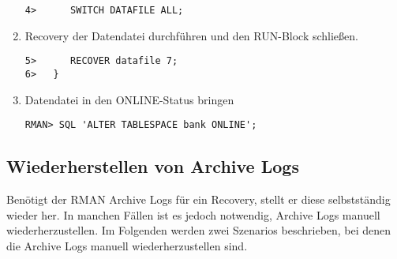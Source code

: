 \begin{enumerate}
            \begin{lstlisting}[caption={Auf den neuen Speicherort umschalten},label=admin1484,language=rman]
4>      SWITCH DATAFILE ALL;
            \end{lstlisting}
            \item Recovery der Datendatei durchf\"uhren und den RUN-Block schlie\ss{}en.
            \begin{lstlisting}[caption={Recovery durchf\"uhren},label=admin1485,language=rman]
5>      RECOVER datafile 7;
6>   }
            \end{lstlisting}
            \item Datendatei in den ONLINE-Status bringen
            \begin{lstlisting}[caption={Datendatei in den ONLINE-Status bringen},label=admin1486,language=rman,emph={[9]ALTER,TABLESPACE,ONLINE},emphstyle={[9]\color{magenta}\bfseries}]
RMAN> SQL 'ALTER TABLESPACE bank ONLINE';
            \end{lstlisting}
          \end{enumerate}
      \subsection{Wiederherstellen von Archive Logs}
        Ben\"otigt der RMAN Archive Logs f\"ur ein Recovery, stellt er diese selbstst\"andig wieder her. In manchen F\"allen ist es jedoch notwendig, Archive Logs manuell wiederherzustellen. Im Folgenden werden zwei Szenarios beschrieben, bei denen die Archive Logs manuell wiederherzustellen sind.
